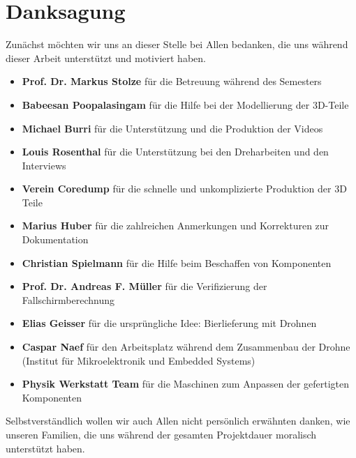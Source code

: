 \newpage
{}
\chapter*{Danksagung}
Zunächst möchten wir uns an dieser Stelle bei Allen bedanken, die uns während dieser Arbeit unterstützt und motiviert haben.
\begin{itemize}
	\item{\textbf{Prof. Dr. Markus Stolze} für die Betreuung während des Semesters}
	\item{\textbf{Babeesan Poopalasingam} für die Hilfe bei der Modellierung der 3D-Teile}
	\item{\textbf{Michael Burri} für die Unterstützung und die Produktion der Videos}
	\item{\textbf{Louis Rosenthal} für die Unterstützung bei den Dreharbeiten und den Interviews}
	\item{\textbf{Verein Coredump} für die schnelle und unkomplizierte Produktion der 3D Teile}
	\item{\textbf{Marius Huber} für die zahlreichen Anmerkungen und Korrekturen zur Dokumentation}
    \item{\textbf{Christian Spielmann} für die Hilfe beim Beschaffen von Komponenten}
	\item{\textbf{Prof. Dr. Andreas F. Müller} für die Verifizierung der Fallschirmberechnung}
	\item{\textbf{Elias Geisser} für die ursprüngliche Idee: Bierlieferung mit Drohnen}
	\item{\textbf{Caspar Naef} für den Arbeitsplatz während dem Zusammenbau der Drohne (Institut für Mikroelektronik und Embedded Systems) }
	\item{\textbf{Physik Werkstatt Team} für die Maschinen zum Anpassen der gefertigten Komponenten}
\end{itemize}
Selbstverständlich wollen wir auch Allen nicht persönlich erwähnten danken, wie unseren Familien, die uns während der gesamten Projektdauer moralisch unterstützt haben.